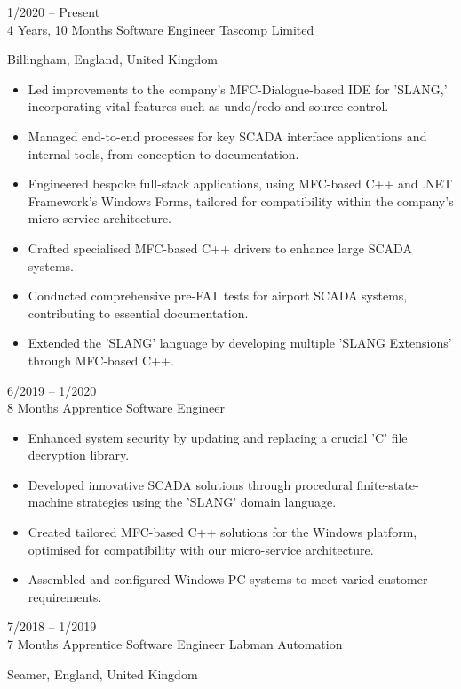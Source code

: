 \documentclass[9pt]{developercv} %
\begin{document}
\begin{entrylist}
	\entry
		{1/2020 -- Present\\4 Years, 10 Months}
		{Software Engineer}
		{Tascomp Limited}
		{Billingham, England, United Kingdom
		
		\begin{itemize}
		    \item[\ding{117}] Led improvements to the company's MFC-Dialogue-based IDE for 'SLANG,' incorporating vital features such as undo/redo and source control.
		    \item[\ding{117}] Managed end-to-end processes for key SCADA interface applications and internal tools, from conception to documentation.
		    \item[\ding{117}] Engineered bespoke full-stack applications, using MFC-based C++ and .NET Framework's Windows Forms, tailored for compatibility within the company’s micro-service architecture.
		    \item[\ding{117}] Crafted specialised MFC-based C++ drivers to enhance large SCADA systems.
		    \item[\ding{117}] Conducted comprehensive pre-FAT tests for airport SCADA systems, contributing to essential documentation.
		    \item[\ding{117}] Extended the 'SLANG' language by developing multiple 'SLANG Extensions' through MFC-based C++.
		\end{itemize}

		}
	\entry
		{6/2019 -- 1/2020\\8 Months}
		{Apprentice Software Engineer}
		{}
		{
		\begin{itemize}
		    \item[\ding{117}] Enhanced system security by updating and replacing a crucial 'C' file decryption library.
		    \item[\ding{117}] Developed innovative SCADA solutions through procedural finite-state-machine strategies using the 'SLANG' domain language.
		    \item[\ding{117}] Created tailored MFC-based C++ solutions for the Windows platform, optimised for compatibility with our micro-service architecture.
		    \item[\ding{117}] Assembled and configured Windows PC systems to meet varied customer requirements.
		\end{itemize}
		
		\vspace{1em}
		\hspace{2em}
		\vspace{1em}
		}
	\entry
		{7/2018 -- 1/2019\\7 Months}
		{Apprentice Software Engineer}
		{Labman Automation}
		{Seamer, England, United Kingdom
		
}
\end{entrylist}
\end{document}
